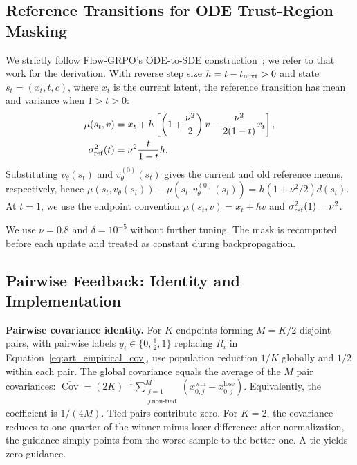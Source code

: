 \documentclass{article}
\begin{document}
\subsection{Reference Transitions for ODE Trust-Region Masking}
\label{app:art_mask}

We strictly follow Flow-GRPO's ODE-to-SDE construction~\citep{liu2025flowgrpo}; we refer to that work for the derivation. With reverse step size $h=t-t_{\rm next}>0$ and state $s_t = (x_t, t, c)$, where $x_t$ is the current latent, the reference transition has mean and variance when $1>t>0$:
\begin{equation}
 \begin{aligned}
 \mu(s_t,v)
 &=x_t+h\left[\left(1+\frac{\nu^2}{2}\right)v-\frac{\nu^2}{2(1-t)}x_t\right],\\
 \sigma_{\rm ref}^2(t)&=\nu^2\frac{t}{1-t}h.
 \end{aligned}
 \label{eq:art_reference_transition}
\end{equation}
Substituting $v_\theta(s_t)$ and $v_\theta^{(0)}(s_t)$ gives the current and old reference means, respectively, hence $\mu(s_t,v_\theta(s_t))-\mu(s_t,v_\theta^{(0)}(s_t))=h(1+\nu^2/2)d(s_t)$. At $t=1$, we use the endpoint convention $\mu(s_t,v)=x_t+hv$ and $\sigma_{\rm ref}^2(1)=\nu^2$.

We use $\nu=0.8$ and $\delta=10^{-5}$ without further tuning. The mask is recomputed before each update and treated as constant during backpropagation.

\subsection{Pairwise Feedback: Identity and Implementation}
\label{app:art_pairwise}
\noindent\textbf{Pairwise covariance identity.}
\label{cor:art_pairwise}
For $K$ endpoints forming $M=K/2$ disjoint pairs, with pairwise labels $y_i\in\{0,\tfrac12,1\}$ replacing $R_i$ in Equation~\ref{eq:art_empirical_cov}, use population reduction $1/K$ globally and $1/2$ within each pair. The global
covariance equals the average of the $M$ pair covariances:
$\overline{\operatorname{Cov}}=(2K)^{-1}\sum_{\substack{j=1\\j\,\mathrm{non\text{-}tied}}}^{M}
(x_{0,j}^{\mathrm{win}}-x_{0,j}^{\mathrm{lose}})$.
Equivalently, the coefficient is $1/(4M)$. Tied pairs contribute zero. For $K=2$, the covariance reduces to one quarter of the winner-minus-loser difference: after normalization, the guidance simply points from the worse sample to the better one. A tie yields zero guidance.
\end{document}
